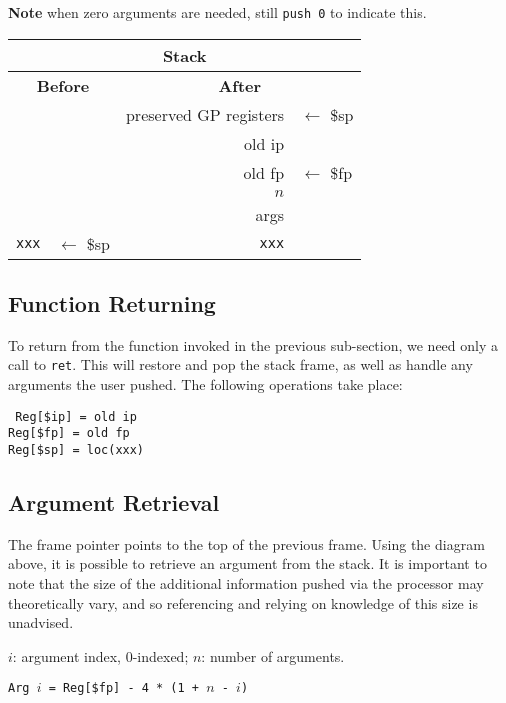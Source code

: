 \documentclass{article}
\begin{document}
\textbf{Note} when zero arguments are needed, still \texttt{push 0} to indicate this.
\medskip

\begin{tabular}{|r l||r l|}
     \hline
     \multicolumn{4}{|c|}{\textbf{Stack}} \\
     \hline
     \multicolumn{2}{|c||}{\textbf{Before}} & \multicolumn{2}{c|}{\textbf{After}} \\
     \hline
     & & preserved GP registers & \(\leftarrow\) \$sp \\
     & & old ip & \\
     & & old fp & \(\leftarrow\) \$fp \\
     & & \(n\) & \\
     & & args & \\
     \texttt{xxx} & \(\leftarrow\) \$sp & \texttt{xxx} & \\
     \hline
\end{tabular}

\subsection{Function Returning}

To return from the function invoked in the previous sub-section, we need only a call to \texttt{ret}.
This will restore and pop the stack frame, as well as handle any arguments the user pushed.
The following operations take place:

\texttt{%
Reg[\$ip] = old ip\\%
Reg[\$fp] = old fp\\%
Reg[\$sp] = loc(xxx)\\%
}

\subsection{Argument Retrieval}

The frame pointer points to the top of the previous frame.
Using the diagram above, it is possible to retrieve an argument from the stack.
It is important to note that the size of the additional information pushed via the processor may theoretically vary, and so referencing and relying on knowledge of this size is unadvised.

\begin{center}
    \(i\): argument index, 0-indexed; \(n\): number of arguments.
    
    \texttt{Arg \(i\) = Reg[\$fp] - 4 * (1 + \(n\) - \(i\))}
\end{center}
\end{document}
